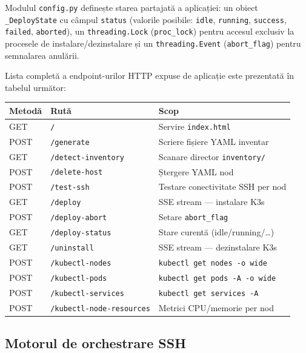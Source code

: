 \documentclass[12pt,a4paper]{report}
\begin{document}
Modulul \texttt{config.py} definește starea partajată a aplicației: un obiect \texttt{\_DeployState} cu câmpul \texttt{status} (valorile posibile: \texttt{idle}, \texttt{running}, \texttt{success}, \texttt{failed}, \texttt{aborted}), un \texttt{threading.Lock} (\texttt{proc\_lock}) pentru accesul exclusiv la procesele de instalare/dezinstalare și un \texttt{threading.Event} (\texttt{abort\_flag}) pentru semnalarea anulării.

Lista completă a endpoint-urilor HTTP expuse de aplicație este prezentată în tabelul următor:

\begin{center}
\begin{tabular}{|l|l|l|}
\hline
\textbf{Metodă} & \textbf{Rută} & \textbf{Scop} \\
\hline
GET  & \texttt{/}                      & Servire \texttt{index.html} \\
POST & \texttt{/generate}              & Scriere fișiere YAML inventar \\
GET  & \texttt{/detect-inventory}      & Scanare director \texttt{inventory/} \\
POST & \texttt{/delete-host}           & Ștergere YAML nod \\
POST & \texttt{/test-ssh}              & Testare conectivitate SSH per nod \\
GET  & \texttt{/deploy}                & SSE stream — instalare K3s \\
POST & \texttt{/deploy-abort}          & Setare \texttt{abort\_flag} \\
GET  & \texttt{/deploy-status}         & Stare curentă (idle/running/…) \\
GET  & \texttt{/uninstall}             & SSE stream — dezinstalare K3s \\
POST & \texttt{/kubectl-nodes}         & \texttt{kubectl get nodes -o wide} \\
POST & \texttt{/kubectl-pods}          & \texttt{kubectl get pods -A -o wide} \\
POST & \texttt{/kubectl-services}      & \texttt{kubectl get services -A} \\
POST & \texttt{/kubectl-node-resources}& Metrici CPU/memorie per nod \\
\hline
\end{tabular}
\end{center}

\subsection{Motorul de orchestrare SSH}
\end{document}
